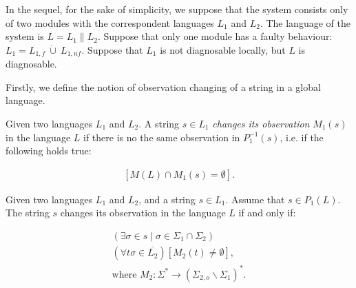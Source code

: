 \documentclass[a4paper, 10pt, conference]{ieeeconf}
\begin{document}
In the sequel, for the sake of simplicity, we suppose that the system consists
only of two modules with the correspondent languages $L_1$ and $L_2$. The
language of the system is $L = L_1 \parallel L_2$. Suppose that only one module
has a faulty behaviour: $L_1 = L_{1,f} ~\dot{\cup}~ L_{1,nf}$.
Suppose that $L_1$ is not diagnosable locally, but $L$ is diagnosable.

Firstly, we define the notion of observation changing of a string in a global
language.
\begin{definition}Given two languages $L_1$ and $L_2$. A string $s \in
L_1$ \emph{changes its observation} $M_1(s)$ in the language $L$ if
there is no the same observation in $P_1^{-1}(s)$, i.e.
if the following holds true:
\end{definition}
\begin{equation}
\label{def:obs}
\begin{array}{l}
	\left[ M(L) \cap M_1(s) = \emptyset \right].
\end{array}
\end{equation}

\begin{lemma}
\label{lem_changed_observation}
Given two languages $L_1$ and $L_2$, and a string $s \in L_1$.
Assume that $s \in P_1(L)$. The string $s$ changes its observation in the
language $L$ if and only if:
\end{lemma}
\begin{subequations}\label{lem:obs}
\begin{align}
	(\exists \sigma \in s \mid \sigma \in \Sigma_1 \cap \Sigma_2)
	\label{lem:obs1}
	\\
	(\forall t\sigma \in \overline{L_2})
	\left[M_2(t) \neq \emptyset \right],
	\label{lem:obs2}
	\\
	\textrm{where } M_2: \Sigma^* \rightarrow (\Sigma_{2,o} \backslash
	\Sigma_1)^*. 
	\label{lem:obs3}
\end{align}
\end{subequations}
\end{document}
